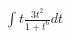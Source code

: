 \documentclass[preview]{standalone}
\begin{document}
\begin{align*}
\int t \frac{3t^2}{1+t^6}dt
\end{align*}
\end{document}
